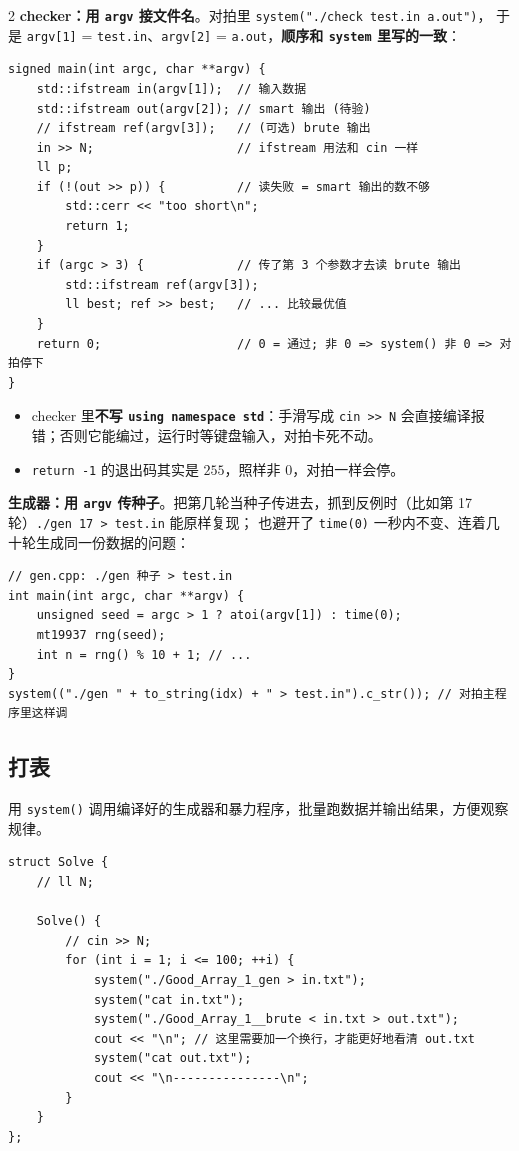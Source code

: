 \begin{multicols*}{2}
	\textbf{checker：用 \texttt{argv} 接文件名}。对拍里 \texttt{system("./check test.in a.out")}，
	于是 \texttt{argv[1]} = \texttt{test.in}、\texttt{argv[2]} = \texttt{a.out}，\textbf{顺序和 \texttt{system} 里写的一致}：

	\begin{verbatim}
signed main(int argc, char **argv) {
	std::ifstream in(argv[1]);  // 输入数据
	std::ifstream out(argv[2]); // smart 输出 (待验)
	// ifstream ref(argv[3]);   // (可选) brute 输出
	in >> N;                    // ifstream 用法和 cin 一样
	ll p;
	if (!(out >> p)) {          // 读失败 = smart 输出的数不够
		std::cerr << "too short\n";
		return 1;
	}
	if (argc > 3) {             // 传了第 3 个参数才去读 brute 输出
		std::ifstream ref(argv[3]);
		ll best; ref >> best;   // ... 比较最优值
	}
	return 0;                   // 0 = 通过; 非 0 => system() 非 0 => 对拍停下
}
	\end{verbatim}

	\begin{itemize}
		\item checker 里\textbf{不写 \texttt{using namespace std}}：手滑写成 \texttt{cin >> N} 会直接编译报错；否则它能编过，运行时等键盘输入，对拍卡死不动。
		\item \texttt{return -1} 的退出码其实是 $255$，照样非 $0$，对拍一样会停。
	\end{itemize}

	\textbf{生成器：用 \texttt{argv} 传种子}。把第几轮当种子传进去，抓到反例时（比如第 17 轮）\texttt{./gen 17 > test.in} 能原样复现；
	也避开了 \texttt{time(0)} 一秒内不变、连着几十轮生成同一份数据的问题：

	\begin{verbatim}
// gen.cpp: ./gen 种子 > test.in
int main(int argc, char **argv) {
	unsigned seed = argc > 1 ? atoi(argv[1]) : time(0);
	mt19937 rng(seed);
	int n = rng() % 10 + 1; // ...
}
system(("./gen " + to_string(idx) + " > test.in").c_str()); // 对拍主程序里这样调
	\end{verbatim}

	\subsection{打表}

	用 \texttt{system()} 调用编译好的生成器和暴力程序，批量跑数据并输出结果，方便观察规律。

	\begin{verbatim}
struct Solve {
	// ll N;

	Solve() {
		// cin >> N;
		for (int i = 1; i <= 100; ++i) {
			system("./Good_Array_1_gen > in.txt");
			system("cat in.txt");
			system("./Good_Array_1__brute < in.txt > out.txt");
			cout << "\n"; // 这里需要加一个换行，才能更好地看清 out.txt
			system("cat out.txt");
			cout << "\n---------------\n";
		}
	}
};
	\end{verbatim}


\end{multicols*}
